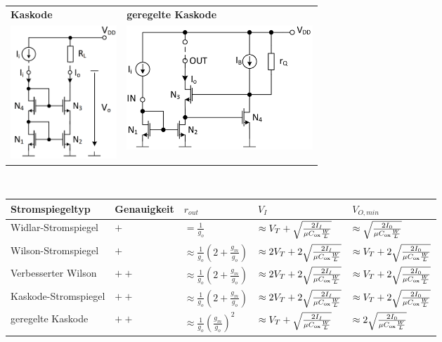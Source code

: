 \begin{tabular}{|l|l|}
    \hline 
    \textbf{Kaskode}  & \textbf{geregelte Kaskode} \\
     \includegraphics[width=4cm]{Kaskode Stromspiegel.png}  & \includegraphics[width=7cm]{Geregelte Kaskode Stromspiegel.png}\\
    \hline 
\end{tabular}\\
\renewcommand{\arraystretch}{1.5}
\begin{tabular}{|l|l|l|l|l|}
    \hline 
    \textbf{Stromspiegeltyp} & \textbf{Genauigkeit} & $r_{out}$ & $V_I$ & $V_{O,min}$ \\
    \hline
    Widlar-Stromspiegel     & $+$     & $=\frac{1}{g_o}$                              & $\approx V_T + \sqrt{\frac{2 I_I}{\mu C_{\rm ox}\frac{W}{L}}}$    & $\approx \sqrt{\frac{2 I_0}{\mu C_{\rm ox}\frac{W}{L}}}$ \\
    \hline
    Wilson-Stromspiegel     & $+$     & $\approx\frac{1}{g_o}(2+\frac{g_m}{g_o})$     & $\approx 2V_T + 2\sqrt{\frac{2 I_I}{\mu C_{\rm ox}\frac{W}{L}}}$   & $\approx V_T + 2\sqrt{\frac{2 I_0}{\mu C_{\rm ox}\frac{W}{L}}}$ \\
    \hline
    Verbesserter Wilson     & $+ +$   & $\approx\frac{1}{g_o}(2+\frac{g_m}{g_o})$     & $\approx 2V_T + 2\sqrt{\frac{2 I_I}{\mu C_{\rm ox}\frac{W}{L}}}$   & $\approx V_T + 2\sqrt{\frac{2 I_0}{\mu C_{\rm ox}\frac{W}{L}}}$ \\
    \hline
    Kaskode-Stromspiegel    & $+ +$   & $\approx\frac{1}{g_o}(2+\frac{g_m}{g_o})$     & $\approx 2V_T + 2\sqrt{\frac{2 I_I}{\mu C_{\rm ox}\frac{W}{L}}}$   & $\approx V_T + 2\sqrt{\frac{2 I_0}{\mu C_{\rm ox}\frac{W}{L}}}$ \\
    \hline
    geregelte Kaskode       & $+ +$   & $\approx\frac{1}{g_o}(\frac{g_m}{g_o})^2$     & $\approx V_T + \sqrt{\frac{2 I_I}{\mu C_{\rm ox}\frac{W}{L}}}$    & $\approx2\sqrt{\frac{2 I_0}{\mu C_{\rm ox}\frac{W}{L}}}$ \\
    \hline
\end{tabular}\\
